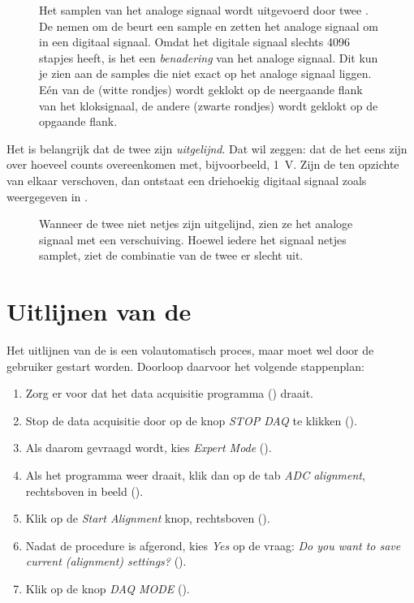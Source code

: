 \begin{figure}
\centering

\caption{Het samplen van het analoge signaal wordt uitgevoerd door twee
\adcs.  De \adcs nemen om de beurt een sample en zetten het analoge
signaal om in een digitaal signaal.  Omdat het digitale signaal slechts
\num{4096} stapjes heeft, is het een \emph{benadering} van het analoge
signaal.  Dit kun je zien aan de samples die niet exact op het analoge
signaal liggen.  Eén van de \adcs (witte rondjes) wordt geklokt op de
neergaande flank van het kloksignaal, de andere \adc (zwarte rondjes)
wordt geklokt op de opgaande flank.}
\label{fig:ADC-sampling}
\end{figure}

Het is belangrijk dat de twee \adcs zijn \emph{uitgelijnd}.  Dat wil
zeggen: dat de \adcs het eens zijn over hoeveel \adc counts overeenkomen
met, bijvoorbeeld, \SI{1}{\volt}.  Zijn de \adcs ten opzichte van elkaar
verschoven, dan ontstaat een driehoekig digitaal signaal zoals weergegeven
in .

\begin{figure}
\centering

\caption{Wanneer de twee \adcs niet netjes zijn uitgelijnd, zien ze het
analoge signaal met een verschuiving.  Hoewel iedere \adc het signaal
netjes samplet, ziet de combinatie van de twee \adcs er slecht uit.}
\label{fig:unaligned-adcs}
\end{figure}


\section{Uitlijnen van de \adcs}

Het uitlijnen van de \adcs is een volautomatisch proces, maar moet wel
door de gebruiker gestart worden.  Doorloop daarvoor het volgende
stappenplan:
\begin{enumerate}
\item Zorg er voor dat het data acquisitie programma (\daq) draait.
\item Stop de data acquisitie door op de knop \emph{STOP DAQ} te klikken
().
\item Als daarom gevraagd wordt, kies \emph{Expert Mode}
().
\item Als het programma weer draait, klik dan op de tab \emph{ADC
alignment}, rechtsboven in beeld ().
\item Klik op de \emph{Start Alignment} knop, rechtsboven
().
\item Nadat de procedure is afgerond, kies \emph{Yes} op de vraag:
\emph{Do you want to save current (alignment) settings?}
().
\item Klik op de knop \emph{DAQ MODE} ().
\end{enumerate}

